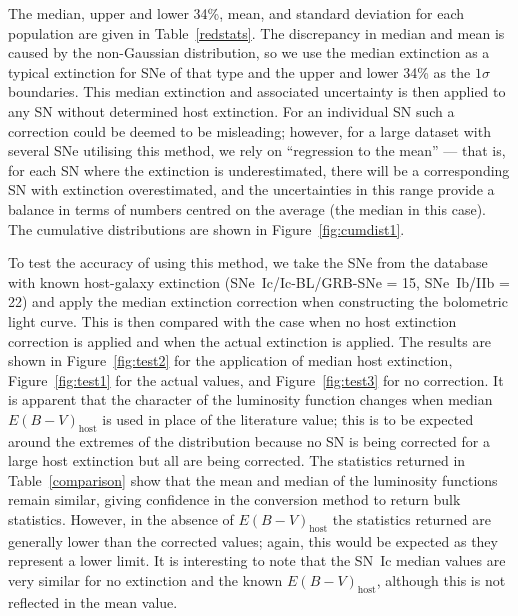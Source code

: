 \documentclass[a4paper,fleqn,usenatbib]{mnras}
\begin{document}
The median, upper and lower 34\%, mean, and standard deviation for each population are given in Table~\ref{redstats}. The discrepancy in median and mean is caused by the non-Gaussian distribution, so we use the median extinction as a typical extinction for SNe of that type and the upper and lower 34\% as the $1\sigma$ boundaries. This median extinction and associated uncertainty is then applied to any SN without determined host extinction. For an individual SN such a correction could be deemed to be misleading; however, for a large dataset with several SNe utilising this method, we rely on ``regression to the mean'' --- that is, for each SN where the extinction is underestimated, there will be a corresponding SN with extinction overestimated, and the uncertainties in this range provide a balance in terms of numbers centred on the average (the median in this case). The cumulative distributions are shown in Figure~\ref{fig:cumdist1}.

To test the accuracy of using this method, we take the SNe from the database with known host-galaxy extinction (SNe~Ic/Ic-BL/GRB-SNe = 15, SNe~Ib/IIb = 22) and apply the median extinction correction when constructing the bolometric light curve. This is then compared with the case when no host extinction correction is applied and when the actual extinction is applied. The results are shown in Figure~\ref{fig:test2} for the application of median host extinction, Figure~\ref{fig:test1} for the actual values, and Figure~\ref{fig:test3} for no correction. It is apparent that the character of the luminosity function changes when median $E(B-V)_{\mathrm{host}}$ is used in place of the literature value; this is to be expected around the extremes of the distribution because no SN is being corrected for a large host extinction but all are being corrected. The statistics returned in Table~\ref{comparison} show that the mean and median of the luminosity functions remain similar, giving confidence in the conversion method to return bulk statistics. However, in the absence of $E(B-V)_{\mathrm{host}}$ the statistics returned are generally lower than the corrected values; again, this would be expected as they represent a lower limit. It is interesting to note that the SN~Ic median values are very similar for no extinction and the known $E(B-V)_{\mathrm{host}}$, although this is not reflected in the mean value. 
\end{document}
